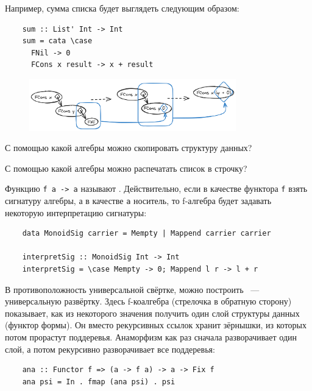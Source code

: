 Например, сумма списка будет выглядеть следующим образом:
\begin{verbatim}
    sum :: List' Int -> Int
    sum = cata \case
      FNil -> 0
      FCons x result -> x + result
\end{verbatim}

\begin{figure}[h]
    \centering
    \includegraphics[width=0.8\textwidth]{figs/cataStep.excalidraw}
\end{figure}

\begin{task}
    С помощью какой алгебры можно скопировать структуру данных?
\end{task}

\begin{task}
    С помощью какой алгебры можно распечатать список в строчку?
\end{task}

Функцию \texttt{f a -> a} называют .
Действительно, если в качестве функтора \texttt{f} взять сигнатуру алгебры, а в качестве \texttt{a} носитель, то f-алгебра будет задавать некоторую интерпретацию сигнатуры:
\begin{verbatim}
    data MonoidSig carrier = Mempty | Mappend carrier carrier

    interpretSig :: MonoidSig Int -> Int
    interpretSig = \case Mempty -> 0; Mappend l r -> l + r
\end{verbatim}

В противоположность универсальной свёртке, можно построить ~---универсальную развёртку.
Здесь f-коалгебра (стрелочка в обратную сторону) показывает, как из некоторого значения получить один слой структуры данных (функтор формы).
Он вместо рекурсивных ссылок хранит зёрнышки, из которых потом прорастут поддеревья.
Анаморфизм как раз сначала разворачивает один слой, а потом рекурсивно разворачивает все поддеревья:
\begin{verbatim}
    ana :: Functor f => (a -> f a) -> a -> Fix f
    ana psi = In . fmap (ana psi) . psi
\end{verbatim}


